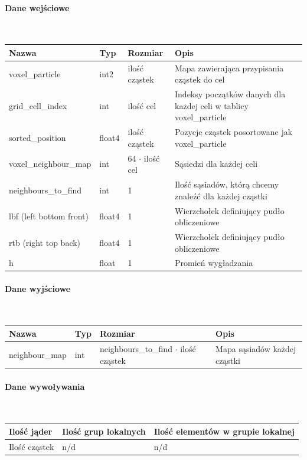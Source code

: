 \documentclass[polish, 12pt]{aghthesis}
\begin{document}
				\paragraph{Dane wejściowe} \ \\
					\begin{tabular}{| p{} | p{} | p{} | p{} |}
					\hline
						Nazwa & Typ & Rozmiar & Opis \\
					\hline
						voxel\_particle & int2 & ilość cząstek & Mapa zawierająca przypisania cząstek do cel \\ 
					\hline
						grid\_cell\_index & int & ilość cel & Indeksy początków danych dla każdej celi w tablicy voxel\_particle \\
					\hline
						sorted\_position & float4 & ilość cząstek & Pozycje cząstek posortowane jak voxel\_particle\\
					\hline
						voxel\_neighbour\_map & int & 64 ${\cdot}$ ilość cel & Sąsiedzi dla każdej celi \\ 
					\hline
						neighbours\_to\_find & int & 1 & Ilość sąsiadów, którą chcemy znaleźć dla każdej cząstki \\ 
					\hline
						lbf (left bottom front)& float4 & 1 & Wierzchołek definiujący pudło obliczeniowe \\ 
					\hline
						rtb (right top back) & float4 & 1 & Wierzchołek definiujący pudło obliczeniowe  \\ 
					\hline
						h & float & 1 & Promień wygładzania \\ 
					\hline	
				\end{tabular}
				\paragraph{Dane wyjściowe} \ \\
					\begin{tabular}{| p{} | p{} | p{} | p{} |}
					\hline
						Nazwa & Typ & Rozmiar & Opis \\
					\hline
						neighbour\_map & int & neighbours\_to\_find ${\cdot}$ ilość cząstek & Mapa sąsiadów każdej cząstki\\
					\hline
				\end{tabular}
				\paragraph{Dane wywoływania} \ \\
					\begin{tabular}{| p{} | p{} | p{}|}
					\hline
						Ilość jąder & Ilość grup lokalnych & Ilość elementów w grupie lokalnej \\
					\hline
						Ilość cząstek & n/d & n/d \\ 
					\hline
					\end{tabular}
\end{document}
